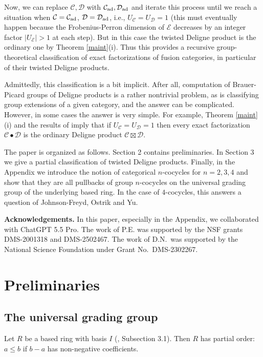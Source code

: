 \documentclass[12pt]{amsart}
\numberwithin{equation}{section}
\theoremstyle{definition}
\newcommand{\1}{_{(1)}}
\newcommand{\2}{_{(2)}}
\newcommand{\3}{_{(3)}}
\newcommand{\4}{_{(4)}}
\newcommand{\5}{_{(5)}}
\newcommand{\6}{_{(6)}}
\newcommand{\C}{\mathcal{C}}
\theoremstyle{plain}
\theoremstyle{definition}
\theoremstyle{remark}
\def\C{\mathcal{C}}
\def\D{\mathcal{D}}
\def\E{\mathcal{E}}
\begin{document}
Now, we can replace $\C,\D$ with $\C_{\rm ad},\D_{\rm ad}$ and iterate this process until we reach a situation when $\C=\C_{\rm ad}$, $\D=\D_{\rm ad}$, i.e., $U_\C=U_\D=1$ (this must eventually happen because the Frobenius-Perron dimension of $\E$ decreases by an integer factor $|U_\E|>1$ at each step).
 But in this case the twisted Deligne product is the ordinary one by Theorem \ref{maint}(i). Thus this provides a recursive group-theoretical classification of exact factorizations of fusion categories, in particular of their twisted Deligne products.

Admittedly, this classification is a bit implicit. After all, computation of Brauer-Picard groups of Deligne products is a rather nontrivial problem, as is classifying group extensions of a given category, and the answer can be complicated. However, in some cases the answer is very simple. For example, Theorem \ref{maint}(i) 
and the results of \cite{MPP} imply that if $U_\C=U_\D=1$ then every exact factorization 
$\C\bullet \D$ is the ordinary Deligne product $\C\boxtimes \D$. 

The paper is organized as follows. Section 2 contains preliminaries. In Section 3 we give a partial classification of twisted Deligne products. Finally, in the Appendix we introduce the notion of categorical $n$-cocycles for $n=2,3,4$ and show that they are all pullbacks of group $n$-cocycles on the universal grading group of the underlying based ring. In the case of $4$-cocycles, this answers a question of Johnson-Freyd, Ostrik and Yu. 

{\bf Acknowledgements.} In this paper, especially in the Appendix, we collaborated with ChatGPT 5.5 Pro. The work of P.E. was supported by the NSF grants DMS-2001318 and DMS-2502467. 
The work of D.N.\ was supported  by  the  National  Science  Foundation  under  Grant No.\ DMS-2302267.

\section{Preliminaries} 

\subsection{The universal grading group} Let $R$ be a based ring with basis $I$  (\cite{EGNO}, Subsection 3.1). Then $R$ has partial order: $a\le b$ if $b-a$ has non-negative coefficients.
\end{document}
